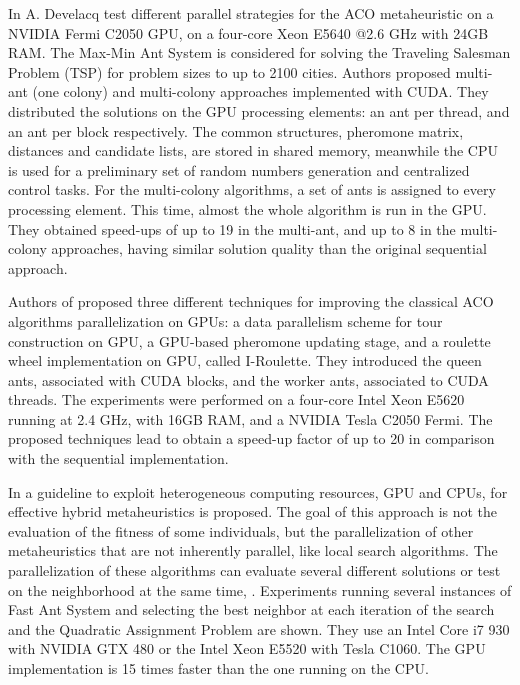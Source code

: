 \documentclass[prodmode,acmtecs]{acmsmall}
\begin{document}
In \cite{ACO-on-GPU_Develacq} A. Develacq test different parallel strategies for the ACO metaheuristic on a NVIDIA Fermi C2050 GPU, on a four-core Xeon E5640 @2.6 GHz with 24GB RAM. The Max-Min Ant System is considered for solving the Traveling Salesman Problem (TSP) for problem sizes to up to 2100 cities. Authors proposed multi-ant (one colony) and multi-colony approaches implemented with CUDA. They distributed the solutions on the GPU processing elements: an ant per thread, and an ant per block respectively. The common structures, pheromone matrix, distances and candidate lists, are stored in shared memory, meanwhile the CPU is used for a preliminary set of random numbers generation and centralized control tasks. For the multi-colony algorithms, a set of ants is assigned to every processing element. This time, almost the whole algorithm is run in the GPU. They obtained speed-ups of up to 19 in the multi-ant, and up to 8 in the multi-colony approaches, having similar solution quality than the original sequential approach.

Authors of \cite{Cecilia201342} proposed three different techniques for improving the classical ACO algorithms parallelization on GPUs: a data parallelism scheme for tour construction on GPU, a GPU-based pheromone updating stage, and a roulette wheel implementation on GPU, called I-Roulette. They introduced the queen ants, associated with CUDA blocks, and the worker ants, associated to CUDA threads. The experiments were performed on a four-core Intel Xeon E5620 running at 2.4 GHz, with 16GB RAM, and a NVIDIA Tesla C2050 Fermi. The proposed techniques lead to obtain a speed-up factor of up to 20 in comparison with the sequential implementation.

In \cite{luong-ppsn2012} a guideline to exploit heterogeneous computing resources, GPU and CPUs, for effective hybrid metaheuristics is proposed. The goal of this approach is not the evaluation of the fitness of some individuals, but the parallelization of other metaheuristics that are not inherently parallel, like local search algorithms. The parallelization of these algorithms can evaluate several different solutions or test on the neighborhood at the same time, \cite{luong:inria-00520461}. Experiments running several instances of Fast Ant System \cite{Taillard:1998:FFA:870509} and selecting the best neighbor at each iteration of the search and the Quadratic Assignment Problem \cite{Zhu:2010:0020-7543:1035} are shown. They use an Intel Core i7 930 with NVIDIA GTX 480 or the Intel Xeon E5520 with Tesla C1060. The GPU implementation is 15 times faster than the one running on the CPU.
\end{document}
